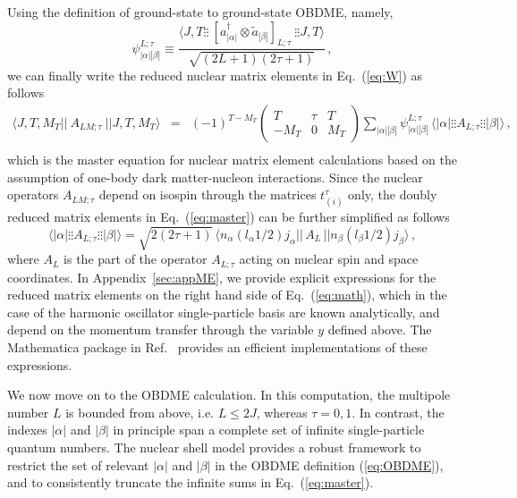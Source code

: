 \documentclass[11pt,a4paper]{article}
\begin{document}
Using the definition of ground-state to ground-state OBDME, namely,
\begin{equation}
\psi^{L;\tau}_{|\alpha||\beta|} \equiv \frac{\langle J, T\vdots\vdots ~[a_{|\alpha|}^{\dagger}\otimes\tilde{a}_{|\beta|}]_{L;\tau}
~\vdots\vdots J, T\rangle}{\sqrt{(2L+1)(2\tau+1)}} \,,
\label{eq:OBDME}
\end{equation}
we can finally write the reduced nuclear matrix elements in Eq.~(\ref{eq:W}) as follows
\begin{eqnarray}
\langle J, T, M_T  ||~ A_{LM;\tau} ~ || J, T, M_T \rangle 
&=& (-1)^{T-M_T}
\begin{pmatrix}
    T&\tau&T\\
    -M_T&0&M_T
  \end{pmatrix} 
   \sum_{|\alpha||\beta|}\psi^{L;\tau}_{|\alpha||\beta|} \,\langle \left|\alpha\right|\vdots\vdots A_{L;\tau}\vdots\vdots \left|\beta\right|\rangle \,, \nonumber\\
   \label{eq:master}
\end{eqnarray}
which is the master equation for nuclear matrix element calculations based on the assumption of one-body dark matter-nucleon interactions. Since the nuclear operators $A_{LM;\tau}$ depend on isospin through the matrices $t^{\tau}_{(i)}$ only, the doubly reduced matrix elements in Eq.~(\ref{eq:master}) can be further simplified as follows
\begin{equation}
\langle \left|\alpha\right|\vdots\vdots A_{L;\tau}\vdots\vdots \left|\beta\right|\rangle = \sqrt{2(2\tau+1)} \,\langle n_{\alpha}(l_\alpha1/2)j_\alpha ||\,A_{L}\,|| n_{\beta}(l_\beta1/2)j_\beta  \rangle\,,
\label{eq:math}
\end{equation}
where $A_L$ is the part of the operator $A_{L;\tau}$ acting on nuclear spin and space coordinates.  
In Appendix~\ref{sec:appME}, we provide explicit expressions for the reduced matrix elements on the right hand side of Eq.~(\ref{eq:math}), which in the case of the harmonic oscillator single-particle basis are known analytically, and depend on the momentum transfer through the variable $y$ defined above. The {\sffamily Mathematica} package in Ref.~\cite{Anand:2013yka} provides an efficient implementations of these expressions.

We now move on to the OBDME calculation. In this computation, the multipole number $L$ is bounded from above, i.e. $L\le 2J$, whereas $\tau=0,1$. In contrast, the indexes $|\alpha|$ and $|\beta|$ in principle span a complete set of infinite single-particle quantum numbers. The nuclear shell model provides a robust framework to restrict the set of relevant $|\alpha|$ and $|\beta|$ in the OBDME definition (\ref{eq:OBDME}), and to consistently truncate the infinite sums in Eq.~(\ref{eq:master}). 
\end{document}
